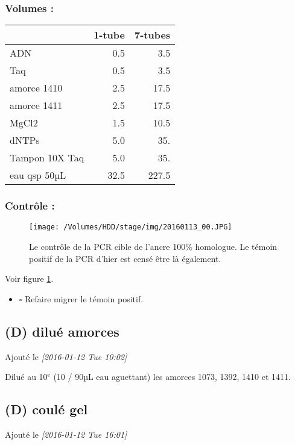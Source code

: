 \documentclass[9pt, oneside, twocolumn]{scrartcl}
\begin{document}
\subsubsection{Volumes :}
\label{sec:orgheadline13}
\begin{center}
\begin{tabular}{lrr}
\toprule
 & 1-tube & 7-tubes\\
\midrule
ADN & 0.5 & 3.5\\
Taq & 0.5 & 3.5\\
amorce 1410 & 2.5 & 17.5\\
amorce 1411 & 2.5 & 17.5\\
MgCl2 & 1.5 & 10.5\\
dNTPs & 5.0 & 35.\\
Tampon 10X Taq & 5.0 & 35.\\
\midrule
eau qsp 50µL & 32.5 & 227.5\\
\bottomrule
\end{tabular}
\end{center}

\subsubsection{Contrôle :}
\label{sec:orgheadline14}

\begin{figure}[htb]
\centering
\texttt{[image: /Volumes/HDD/stage/img/20160113\_00.JPG]}
\caption{\label{fig:orgparagraph1}
Le contrôle de la PCR cible de l'ancre 100\% homologue. Le témoin positif de la PCR d'hier est censé être là également. }
\end{figure}

Voir figure \ref{fig:orgparagraph1}. 

\begin{itemize}
\item $\square$ Refaire migrer le témoin positif.
\end{itemize}

\subsection{(D) dilué amorces}
\label{sec:orgheadline16}
Ajouté le \textit{[2016-01-12 Tue 10:02]}

Dilué au 10\(^{\text{e}}\) (10 / 90µL eau aguettant) les amorces 1073, 1392, 1410 et 1411.

\subsection{(D) coulé gel}
\label{sec:orgheadline17}
Ajouté le \textit{[2016-01-12 Tue 16:01]}
\end{document}
